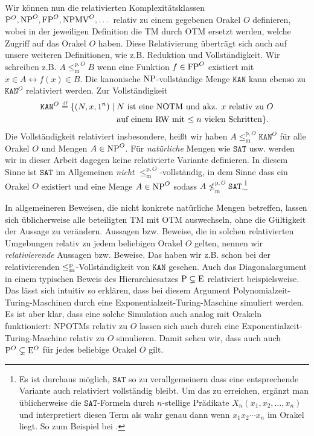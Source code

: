 Wir können nun die relativierten Komplexitätsklassen $\P^O, \NP^O, \FP^O, \NPMV^O, \dots$ relativ zu einem gegebenen Orakel $O$ definieren, wobei in der jeweiligen Definition die TM durch OTM ersetzt werden, welche Zugriff auf das Orakel $O$ haben.
Diese Relativierung überträgt sich auch auf unsere weiteren Definitionen, wie z.B. Reduktion und Vollständigkeit. Wir schreiben z.B. $A\leq_\mathrm{m}^{\mathrm{p},O} B$ wenn eine Funktion $f\in\FP^O$ existiert mit $x\in A \leftrightarrow f(x)\in B$.
Die kanonische $\NP$-vollständige Menge $\mathtt{KAN}$ kann ebenso zu $\mathtt{KAN}^O$ relativiert werden. Zur Vollständigkeit
\[ \begin{split} \mathtt{KAN}^O \defeq \{ (N, x, 1^n) \mid {}&\text{$N$ ist eine NOTM und akz. $x$ relativ zu $O$}\\&\text{auf einem RW mit $\leq n$ vielen Schritten} \}. \end{split} \]
Die Vollständigkeit relativiert insbesondere, heißt wir haben $A\leq_\mathrm{m}^{\mathrm{p},O}\mathtt{KAN}^O$ für alle Orakel $O$ und Mengen $A\in\NP^O$.
Für \emph{natürliche} Mengen wie $\mathtt{SAT}$ usw. werden wir in dieser Arbeit dagegen keine relativierte Variante definieren. In diesem Sinne ist $\mathtt{SAT}$ im Allgemeinen \emph{nicht} $\leq_\mathrm{m}^{\mathrm{p},O}$-vollständig, in dem Sinne dass ein Orakel $O$ existiert und eine Menge $A\in\NP^O$ sodass $A\not\leq_\mathrm{m}^{\mathrm{p},O} \mathtt{SAT}$.\footnote{Es ist durchaus möglich, $\mathtt{SAT}$ so zu verallgemeinern dass eine entsprechende Variante auch relativiert vollständig bleibt. Um das zu erreichen, ergänzt man üblicherweise die $\mathtt{SAT}$-Formeln durch $n$-stellige Prädikate $X_n(x_1, x_2, \dots, x_n)$ und interpretiert diesen Term als wahr genau dann wenn $x_1x_2\cdots x_n$ im Orakel liegt. So zum Beispiel bei \textcite{dingel_separation_2022}.}

In allgemeineren Beweisen, die nicht konkrete natürliche Mengen betreffen, lassen sich üblicherweise alle beteiligten TM mit OTM auswechseln, ohne die Gültigkeit der Aussage zu verändern.
Aussagen bzw. Beweise, die in solchen relativierten Umgebungen relativ zu jedem beliebigen Orakel $O$ gelten, nennen wir \emph{relativierende} Aussagen bzw. Beweise.
Das haben wir z.B. schon bei der relativierenden $\leqmp$-Vollständigkeit von $\mathtt{KAN}$ gesehen.
Auch das Diagonalargument in einem typischen Beweis des Hierarchiesatzes $\P\subsetneq\mathrm{E}$ relativiert beispielsweise. Das lässt sich intuitiv so erklären, dass bei diesem Argument Polynomialzeit-Turing-Maschinen durch eine Exponentialzeit-Turing-Maschine simuliert werden. Es ist aber klar, dass eine solche Simulation auch analog mit Orakeln funktioniert: NPOTMs relativ zu $O$ lassen sich auch durch eine Exponentialzeit-Turing-Maschine relativ zu $O$ simulieren. Damit sehen wir, dass auch auch $\P^O\subsetneq\mathrm{E}^O$ für jedes beliebige Orakel $O$ gilt. 

